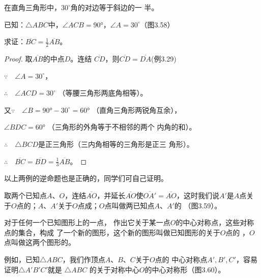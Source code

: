 \begin{example}
    在直角三角形中，$30^{\circ}$角的对边等于斜边的一
半。
\end{example}

已知：$\triangle ABC$中，$\angle ACB=\ang{90}$，$\angle A=30^{\circ}$（图3.58）

求证：$\overline{BC}=\frac{1}{2}\overline{AB}$。

\begin{proof}
    取$\overline{AB}$的中点$D$。连结
    $\overline{CD}$，则$\overline{CD}=\overline{DA}$(例3.29)

$\because\quad \angle A=30^{\circ}$，

$\therefore\quad \angle ACD=30^{\circ}$ （等腰三角形两底角相等）。

又$\because\quad \angle B=\ang{90} -30^{\circ} =\ang{60}$ （直角三角形两锐角互余），

$ \angle BDC=\ang{60}$ （三角形的外角等于不相邻的两个
    内角的和）。

$\therefore\quad \triangle BCD$是正三角形（三内角相等的三角形是正三
    角形）。

$\therefore\quad  \overline{BC}= \overline{BD}=\frac{1}{3} \overline{AB}$。
 \end{proof}

以上两例的逆命题也是正确的，同学们可自己证明。   
    
\begin{Definition}
取两个已知点$A$、$O$，连结$\overline{AO}$，并延长$\overline{AO}$使$\overline{OA'}=\overline{AO}$，这时我们说$A'$是$A$点关于$O$点的；$A$、$A'$关于$O$点成；$O$点叫做两已知点$A$、$A'$的
（图3.59）。 
\end{Definition}

\begin{figure}
    \centering
    \caption{}
\end{figure}

对于任何一个已知图形上的一点，
作出它关于某一点$O$的中心对称点，这些对称点的集合，构成
了一个新的图形，这个新的图形叫做已知图形的关于$O$点的
，$O$点叫做这两个图形的。

例如，已知$\triangle ABC$，我们作顶点$A$、$B$、$C$关于$O$点的
中心对称点$A',B',C'$，容易证明$\triangle A'B'C'$就是
$\triangle ABC$
的关于对称中心$O$的中心对称形（图3.60）。

